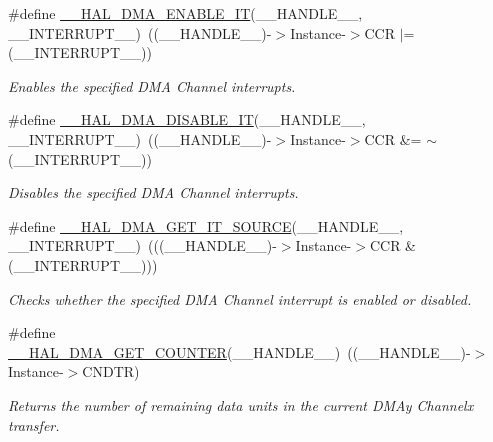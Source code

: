 \begin{DoxyCompactItemize}
\#define \hyperlink{group___d_m_a___exported___macros_ga2124233229c04ca90b790cd8cddfa98b}{\+\_\+\+\_\+\+H\+A\+L\+\_\+\+D\+M\+A\+\_\+\+E\+N\+A\+B\+L\+E\+\_\+\+IT}(\+\_\+\+\_\+\+H\+A\+N\+D\+L\+E\+\_\+\+\_\+,  \+\_\+\+\_\+\+I\+N\+T\+E\+R\+R\+U\+P\+T\+\_\+\+\_\+)~((\+\_\+\+\_\+\+H\+A\+N\+D\+L\+E\+\_\+\+\_\+)-\/$>$Instance-\/$>$C\+CR $\vert$= (\+\_\+\+\_\+\+I\+N\+T\+E\+R\+R\+U\+P\+T\+\_\+\+\_\+))
\begin{DoxyCompactList}\small\item\em Enables the specified D\+MA Channel interrupts. \end{DoxyCompactList}\item 
\#define \hyperlink{group___d_m_a___exported___macros_ga2867eab09398df2daac55c3f327654da}{\+\_\+\+\_\+\+H\+A\+L\+\_\+\+D\+M\+A\+\_\+\+D\+I\+S\+A\+B\+L\+E\+\_\+\+IT}(\+\_\+\+\_\+\+H\+A\+N\+D\+L\+E\+\_\+\+\_\+,  \+\_\+\+\_\+\+I\+N\+T\+E\+R\+R\+U\+P\+T\+\_\+\+\_\+)~((\+\_\+\+\_\+\+H\+A\+N\+D\+L\+E\+\_\+\+\_\+)-\/$>$Instance-\/$>$C\+CR \&= $\sim$(\+\_\+\+\_\+\+I\+N\+T\+E\+R\+R\+U\+P\+T\+\_\+\+\_\+))
\begin{DoxyCompactList}\small\item\em Disables the specified D\+MA Channel interrupts. \end{DoxyCompactList}\item 
\#define \hyperlink{group___d_m_a___exported___macros_ga206f24e6bee4600515b9b6b1ec79365b}{\+\_\+\+\_\+\+H\+A\+L\+\_\+\+D\+M\+A\+\_\+\+G\+E\+T\+\_\+\+I\+T\+\_\+\+S\+O\+U\+R\+CE}(\+\_\+\+\_\+\+H\+A\+N\+D\+L\+E\+\_\+\+\_\+,  \+\_\+\+\_\+\+I\+N\+T\+E\+R\+R\+U\+P\+T\+\_\+\+\_\+)~(((\+\_\+\+\_\+\+H\+A\+N\+D\+L\+E\+\_\+\+\_\+)-\/$>$Instance-\/$>$C\+CR \& (\+\_\+\+\_\+\+I\+N\+T\+E\+R\+R\+U\+P\+T\+\_\+\+\_\+)))
\begin{DoxyCompactList}\small\item\em Checks whether the specified D\+MA Channel interrupt is enabled or disabled. \end{DoxyCompactList}\item 
\#define \hyperlink{group___d_m_a___exported___macros_ga082d691311bac96641dc35a17cfe8e63}{\+\_\+\+\_\+\+H\+A\+L\+\_\+\+D\+M\+A\+\_\+\+G\+E\+T\+\_\+\+C\+O\+U\+N\+T\+ER}(\+\_\+\+\_\+\+H\+A\+N\+D\+L\+E\+\_\+\+\_\+)~((\+\_\+\+\_\+\+H\+A\+N\+D\+L\+E\+\_\+\+\_\+)-\/$>$Instance-\/$>$C\+N\+D\+TR)
\begin{DoxyCompactList}\small\item\em Returns the number of remaining data units in the current D\+M\+Ay Channelx transfer. \end{DoxyCompactList}\end{DoxyCompactItemize}


